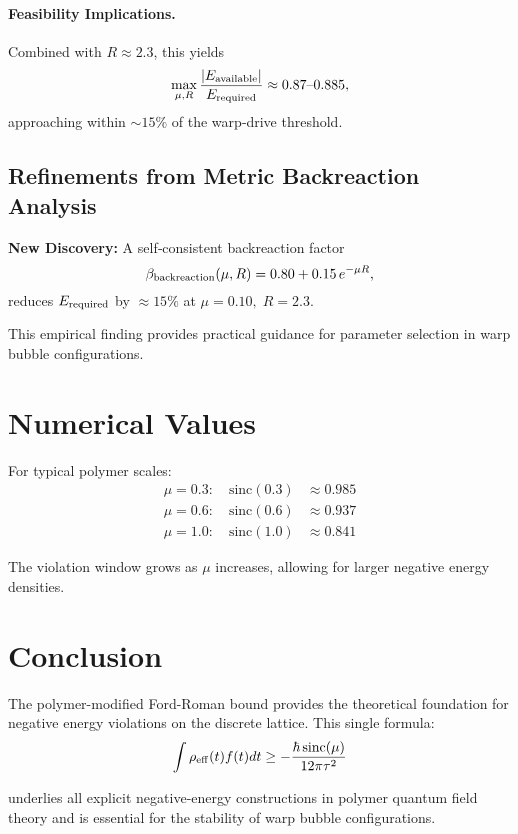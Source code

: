\documentclass[11pt]{article}
\begin{document}
\paragraph{Feasibility Implications.}
Combined with $R \approx 2.3$, this yields
\[
  \max_{\mu,R}\frac{|E_{\rm available}|}{E_{\rm required}} \approx 0.87\text{--}0.885,
\]
approaching within $\sim15\%$ of the warp‐drive threshold.

\subsection*{Refinements from Metric Backreaction Analysis}
\textbf{New Discovery:} A self‐consistent backreaction factor
\[
  \beta_{\rm backreaction}(\mu,R) = 0.80 + 0.15\,e^{-\mu R},
\]
reduces $E_{\rm required}$ by $\approx15\%$ at $\mu=0.10,\;R=2.3$.  

This empirical finding provides practical guidance for parameter selection in warp bubble configurations.

\section{Numerical Values}

For typical polymer scales:
\begin{align}
\mu = 0.3: \quad \mathrm{sinc}(0.3) &\approx 0.985 \\
\mu = 0.6: \quad \mathrm{sinc}(0.6) &\approx 0.937 \\
\mu = 1.0: \quad \mathrm{sinc}(1.0) &\approx 0.841
\end{align}

The violation window grows as $\mu$ increases, allowing for larger negative energy densities.

\section{Conclusion}

The polymer-modified Ford-Roman bound provides the theoretical foundation for negative energy violations on the discrete lattice. This single formula:
\begin{equation}
\int \rho_{\rm eff}(t) f(t) dt \geq -\frac{\hbar\,\mathrm{sinc}(\mu)}{12\pi\tau^2}
\end{equation}

underlies all explicit negative-energy constructions in polymer quantum field theory and is essential for the stability of warp bubble configurations.
\end{document}
